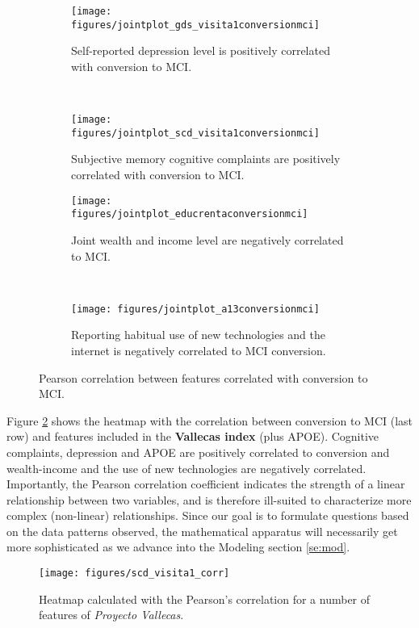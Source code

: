 \documentclass[11pt]{article}
\theoremstyle{definition}
\theoremstyle{remark}
\begin{document}
\begin{figure}[H]
    \centering
    \begin{subfigure}[t]{0.45\textwidth}
        \centering
        \texttt{[image: figures/jointplot\_gds\_visita1conversionmci]}
        \caption{Self-reported depression level is positively correlated with conversion to MCI.}
    \end{subfigure}
    ~ 
    \begin{subfigure}[t]{0.45\textwidth}
        \centering
        \texttt{[image: figures/jointplot\_scd\_visita1conversionmci]}
        \caption{Subjective memory cognitive complaints are positively correlated with conversion to MCI.}
    \end{subfigure}%
    
     \begin{subfigure}[t]{0.45\textwidth}
        \centering
        \texttt{[image: figures/jointplot\_educrentaconversionmci]}
        \caption{Joint wealth and income level are negatively correlated to MCI.}
    \end{subfigure}
    ~ 
    \begin{subfigure}[t]{0.45\textwidth}
        \centering
        \texttt{[image: figures/jointplot\_a13conversionmci]}
        \caption{Reporting habitual use of new technologies and the internet is negatively correlated to MCI conversion.}
    \end{subfigure}%
   
    \caption{Pearson correlation between features correlated with conversion to MCI.} \label{fig:multico}
\end{figure}

Figure \ref{fig:heatmappearson} shows the heatmap with the correlation between conversion to MCI (last row) and features included in the \textbf{Vallecas index} (plus APOE). Cognitive complaints, depression and APOE are positively correlated to conversion and wealth-income and the use of new technologies are negatively correlated. 
Importantly, the Pearson correlation coefficient indicates the strength of a linear relationship between two variables, and is therefore ill-suited to characterize more complex (non-linear) relationships.
Since our goal is to formulate questions based on the data patterns observed, the mathematical apparatus will necessarily get more sophisticated as we advance into the Modeling section \ref{se:mod}. 
 
 \begin{figure}[h!]
        \centering
        \texttt{[image: figures/scd\_visita1\_corr]}
        \caption{Heatmap calculated with the Pearson's correlation for a number of features of \emph{Proyecto Vallecas}.
        } \label{fig:heatmappearson}
\end{figure}
\end{document}
